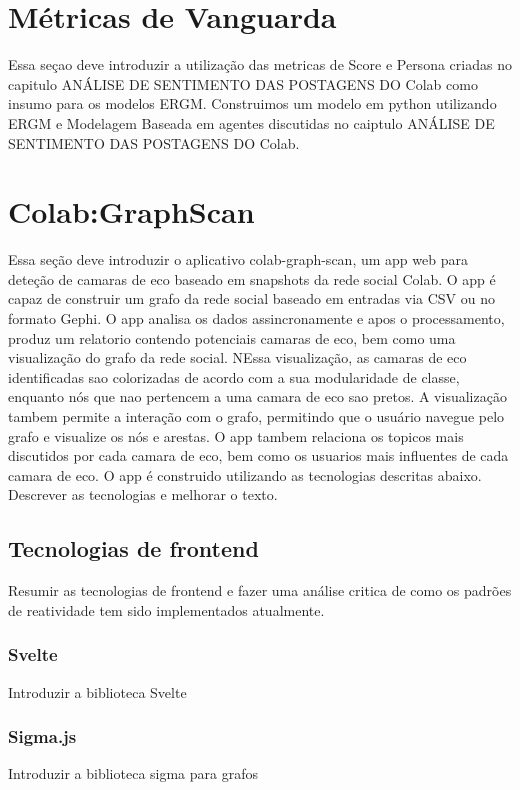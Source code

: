 \section{Métricas de Vanguarda}
Essa seçao deve introduzir a utilização das metricas de Score e Persona criadas no capitulo ANÁLISE DE SENTIMENTO DAS POSTAGENS DO Colab como insumo para os modelos ERGM. Construimos um modelo em python utilizando ERGM e Modelagem Baseada em agentes discutidas no caiptulo ANÁLISE DE SENTIMENTO DAS POSTAGENS DO Colab.
\lipsum[4]

\section{Colab:GraphScan}
Essa seção deve introduzir o aplicativo colab-graph-scan, um app web para deteção de camaras de eco baseado em snapshots da rede social Colab. O app é capaz de construir um grafo da rede social baseado em entradas via CSV ou no formato Gephi. O app analisa os dados assincronamente e apos o processamento, produz um relatorio contendo potenciais camaras de eco, bem como uma visualização do grafo da rede social. NEssa visualização, as camaras de eco identificadas sao colorizadas de acordo com a sua modularidade de classe, enquanto nós que nao pertencem a uma camara de eco sao pretos. A visualização tambem permite a interação com o grafo, permitindo que o usuário navegue pelo grafo e visualize os nós e arestas. O app tambem relaciona os topicos mais discutidos por cada camara de eco, bem como os usuarios mais influentes de cada camara de eco.
O app é construido utilizando as tecnologias descritas abaixo.
Descrever as tecnologias e melhorar o texto.
\lipsum[5]

\subsection{Tecnologias de frontend}
Resumir as tecnologias de frontend e fazer uma análise critica de como os padrões de reatividade tem sido implementados atualmente.
\lipsum[5]

\subsubsection*{Svelte}
Introduzir a biblioteca Svelte
\lipsum[5]

\subsubsection*{Sigma.js}
Introduzir a biblioteca sigma para grafos
\lipsum[5]

